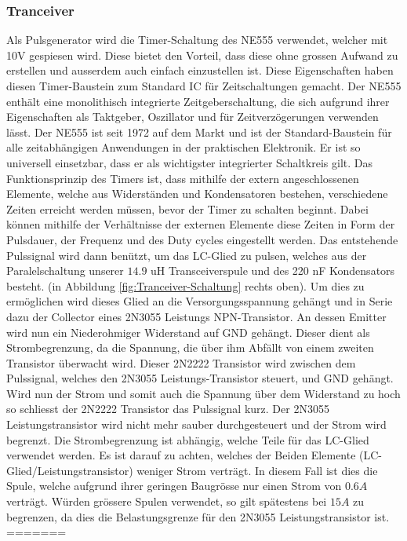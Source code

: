 \subsubsection*{Tranceiver}
Als Pulsgenerator wird die Timer-Schaltung des NE555 verwendet, welcher mit 10V gespiesen wird. Diese bietet den Vorteil, dass diese ohne grossen Aufwand zu erstellen und ausserdem auch einfach einzustellen ist. Diese Eigenschaften haben diesen Timer-Baustein zum Standard IC für Zeitschaltungen gemacht. Der NE555 enthält eine monolithisch integrierte Zeitgeberschaltung, die sich aufgrund ihrer Eigenschaften als Taktgeber, Oszillator und für Zeitverzögerungen verwenden lässt. Der NE555 ist seit 1972 auf dem Markt und ist der Standard-Baustein für alle zeitabhängigen Anwendungen in der praktischen Elektronik. Er ist so universell einsetzbar, dass er als wichtigster integrierter Schaltkreis gilt. Das Funktionsprinzip des Timers ist, dass mithilfe der extern angeschlossenen Elemente, welche aus Widerständen und Kondensatoren bestehen, verschiedene Zeiten erreicht werden müssen, bevor der Timer zu schalten beginnt. Dabei können mithilfe der Verhältnisse der externen Elemente diese Zeiten in Form der Pulsdauer, der Frequenz und des Duty cycles eingestellt werden. Das entstehende Pulssignal wird dann benützt, um das LC-Glied zu pulsen, welches aus der Paralelschaltung unserer $14.9$ uH Transceiverspule und des 220 nF Kondensators besteht. (in Abbildung \ref{fig:Tranceiver-Schaltung} rechts oben). Um dies zu ermöglichen wird dieses Glied an die Versorgungsspannung gehängt und in Serie dazu der Collector eines 2N3055 Leistungs NPN-Transistor. An dessen Emitter wird nun ein Niederohmiger Widerstand auf GND gehängt. Dieser dient als Strombegrenzung, da die Spannung, die über ihm Abfällt von einem zweiten Transistor überwacht wird. Dieser 2N2222 Transistor wird zwischen dem Pulssignal, welches den 2N3055 Leistungs-Transistor steuert, und GND gehängt. Wird nun der Strom und somit auch die Spannung über dem Widerstand zu hoch so schliesst der 2N2222 Transistor das Pulssignal kurz. Der 2N3055 Leistungstransistor wird nicht mehr sauber durchgesteuert und der Strom wird begrenzt. Die Strombegrenzung ist abhängig, welche Teile für das LC-Glied verwendet werden. Es ist darauf zu achten, welches der Beiden Elemente (LC-Glied/Leistungstransistor) weniger Strom verträgt. In diesem Fall ist dies die Spule, welche aufgrund ihrer geringen Baugrösse nur einen Strom von $0.6A$ verträgt. Würden grössere Spulen verwendet, so gilt spätestens bei $15A$ zu begrenzen, da dies die Belastungsgrenze für den 2N3055 Leistungstransistor ist.   
=======
